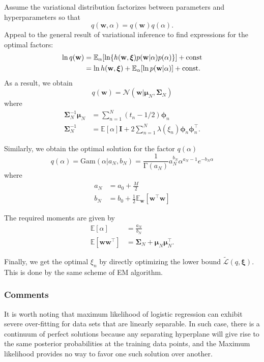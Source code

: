 \documentclass[a4paper]{report}
\newcommand{\up}{\mathrm}
\renewcommand{\bf}{\mathbf}
\renewcommand{\cal}{\mathcal}
\newcommand{\bb}{\mathbb}
\newcommand{\bs}{\boldsymbol}
\begin{document}
Assume the variational distribution factorizes between parameters and hyperparameters so that
\begin{equation}
	q(\bf{w},\alpha) = q(\bf{w})q(\alpha).
\end{equation}
Appeal to the general result of variational inference to find expressions for the optimal factors:
\begin{align}
	\ln q(\bf{w}) &= \bb{E}_{\alpha} [\ln \{ h(\bf{w},\bs{\xi})p(\bf{w}|\alpha)p(\alpha) \}] + \up{const} \notag \\
	&= \ln h(\bf{w},\bs{\xi}) + \bb{E}_{\alpha}[ \ln p(\bf{w}|\alpha) ]+ \up{const}.
\end{align}
As a result, we obtain
\begin{equation}
	q(\bf{w}) = \cal{N}(\bf{w}|\bs{\mu}_N,\bs{\Sigma}_N)
\end{equation}
where
\begin{align}
	\bs{\Sigma}_N^{-1} \bs{\mu}_N &= \sum_{n=1}^N (t_n -1/2) \bs{\phi}_n \\
	\bs{\Sigma}_N^{-1} &= \bb{E}[\alpha] \bf{I} + 2 \sum_{n=1}^N \lambda(\xi_n)\bs{\phi}_n \bs{\phi}_n^{\intercal}.
\end{align}

Similarly, we obtain the optimal solution for the factor $q(\alpha)$
\begin{equation}
	q(\alpha) = \up{Gam}(\alpha|a_N,b_N) = \frac{1}{\up{\Gamma}(a_N)}a_N^{b_N}\alpha^{a_N-1}e^{-b_N\alpha} 
\end{equation}
where
\begin{align}
	a_N &= a_0 + \frac{M}{2} \\
	b_N &= b_0 + \frac{1}{2} \bb{E}_{\bf{w}}[\bf{w}^{\intercal} \bf{w}]
\end{align}

The required moments are given by
\begin{align}
	\bb{E}[\alpha] &= \frac{a_N}{b_N} \\
	\bb{E}[\bf{w}\bf{w}^{\intercal}] &= \bs{\Sigma}_N + \bs{\mu}_N \bs{\mu}_N^{\intercal}.
\end{align}

Finally, we get the optimal $\xi_n$ by directly optimizing the lower bound $\tilde{\cal{L}}(q,\bs{\xi})$. This is done by the same scheme of EM algorithm.
\subsubsection{Comments}
It is worth noting that maximum likelihood of logistic regression can exhibit severe over-fitting for data sets that are linearly separable. In such case, there is a continuum of perfect solutions because any separating hyperplane will give rise to the same posterior probabilities at the training data points, and the Maximum likelihood provides no way to favor one such solution over another.
\end{document}
